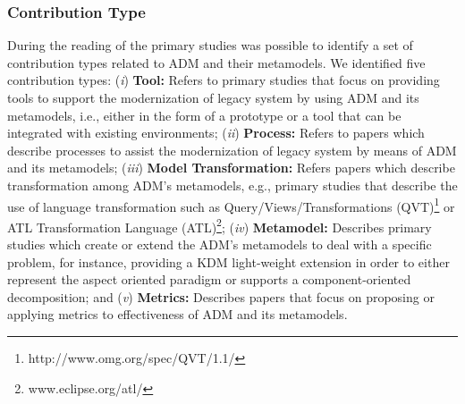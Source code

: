 

\subsubsection{Contribution Type}


During the reading of the primary studies was possible to identify a set of contribution types related to ADM and their metamodels. We identified five contribution types: (\textit{i}) \textbf{Tool:} Refers to primary studies that focus on providing tools to support the modernization of legacy system by using ADM and its metamodels, i.e., either in the form of a prototype or a tool that can be integrated with existing environments; (\textit{ii}) \textbf{Process:} Refers to papers which describe processes to assist the modernization of legacy system by means of ADM and its metamodels; (\textit{iii}) \textbf{Model Transformation:} Refers papers which describe transformation among ADM's metamodels, e.g., primary studies that describe the use of language transformation such as Query/Views/Transformations (QVT)\footnote{http://www.omg.org/spec/QVT/1.1/} or ATL Transformation Language (ATL)\footnote{www.eclipse.org/atl/}; (\textit{iv}) \textbf{Metamodel:} Describes primary studies which create or extend the ADM's metamodels to deal with a specific problem, for instance, providing a KDM light-weight extension in order to either represent the aspect oriented paradigm or supports a component-oriented decomposition; and (\textit{v}) \textbf{Metrics:} Describes papers that focus on proposing or applying metrics to effectiveness of ADM and its metamodels.







